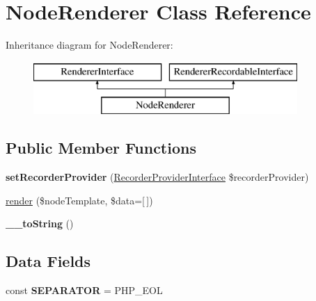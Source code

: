 \hypertarget{class_pes_1_1_view_1_1_renderer_1_1_node_renderer}{}\section{Node\+Renderer Class Reference}
\label{class_pes_1_1_view_1_1_renderer_1_1_node_renderer}
Inheritance diagram for Node\+Renderer\+:\begin{figure}[H]
\begin{center}
\leavevmode
\includegraphics[height=2.000000cm]{class_pes_1_1_view_1_1_renderer_1_1_node_renderer}
\end{center}
\end{figure}
\subsection*{Public Member Functions}
\begin{DoxyCompactItemize}
\item 
\mbox{\label{class_pes_1_1_view_1_1_renderer_1_1_node_renderer_a8fd12d6021bfe986b2f45230378d6bc2}} 
{\bfseries set\+Recorder\+Provider} (\mbox{\hyperlink{interface_pes_1_1_view_1_1_recorder_1_1_recorder_provider_interface}{Recorder\+Provider\+Interface}} \$recorder\+Provider)
\item 
\mbox{\hyperlink{class_pes_1_1_view_1_1_renderer_1_1_node_renderer_a3137b10938a1f54b1982676a1dae1227}{render}} (\$node\+Template, \$data=\mbox{[}$\,$\mbox{]})
\item 
\mbox{\label{class_pes_1_1_view_1_1_renderer_1_1_node_renderer_a7516ca30af0db3cdbf9a7739b48ce91d}} 
{\bfseries \+\_\+\+\_\+to\+String} ()
\end{DoxyCompactItemize}
\subsection*{Data Fields}
\begin{DoxyCompactItemize}
\item 
\mbox{\label{class_pes_1_1_view_1_1_renderer_1_1_node_renderer_a8e88e16132e9235e0f03b7581e8d4f62}} 
const {\bfseries S\+E\+P\+A\+R\+A\+T\+OR} = P\+H\+P\+\_\+\+E\+OL
\end{DoxyCompactItemize}


